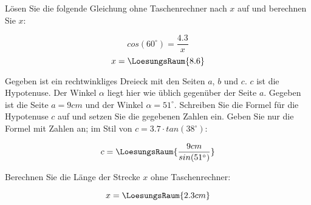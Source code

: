 
\begin{frage}[1]
  Lösen Sie die folgende Gleichung ohne Taschenrechner nach $x$ auf und berechnen Sie $x$:

  $$cos(60^\circ)=\frac{4.3}{x}$$
  \vspace{7mm}
  $$x = \LoesungsRaum{8.6}$$

\end{frage}


%
%  


\begin{frage}[2]
  Gegeben ist ein rechtwinkliges Dreieck mit den Seiten $a$, $b$ und
  $c$. $c$ ist die Hypotenuse. Der Winkel $\alpha$ liegt hier wie
  üblich gegenüber der Seite $a$.
  Gegeben ist die Seite $a = 9cm$ und der Winkel $\alpha = 51^\circ$.
  Schreiben Sie die Formel für die Hypotenuse $c$ auf und setzen Sie
  die gegebenen Zahlen ein. Geben Sie nur die Formel mit Zahlen an; im Stil von
  $c = 3.7 \cdot tan(38^\circ)$:
  
  \vspace{7mm}
  
  $$c = \LoesungsRaum{\frac{9cm}{sin(51^\circ)}}$$

\end{frage}


\begin{frage}[1]
 Berechnen Sie die Länge der Strecke $x$ ohne Taschenrechner: 
\begin{center}
\end{center}

$$x=\LoesungsRaum{2.3cm}$$

\end{frage}
  

